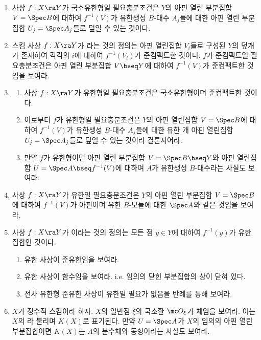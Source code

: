 	\begin{enumerate}[label=\tb{3.\arabic*.},itemindent=0mm,itemsep=2mm]
	\item 사상 $f:X\ra Y$가 국소유한형일 필요충분조건은 $Y$의  아핀 열린 부분집합 $V=\Spec B$에 대하여
	$f^{-1}(V)$가 유한생성 $B$-대수 $A_j$들에 대한 아핀 열린 부분집합 $U_j=\Spec A_j$들로 덮일 수 있는 것이다.
	\item 스킴 사상 $f:X\ra Y$가 라는 것의 정의는 아핀 열린집합 $V_i$들로 구성된
	$Y$의 덮개가 존재하여 각각의 $i$에 대하여 $f^{-1}(V_i)$가 준컴팩트한 것이다.
	$f$가 준컴팩트일 필요충분조건은  아핀 열린 부분집합 $V\bseq Y$에 대하여 $f^{-1}(V)$가 준컴팩트한 것임을 보여라.
	\item \begin{enumerate}[label=(\alph*)]
	\item 사상 $f:X\ra Y$가 유한형일 필요충분조건은 국소유한형이며 준컴팩트한 것이다.
	\item 이로부터 $f$가 유한형일 필요충분조건은 $Y$의  아핀 열린집합 $V=\Spec B$에 대하여
	$f^{-1}(V)$가 유한생성 $B$-대수 $A_j$들에 대한 유한 개 아핀 열린집합 $U_j=\Spec A_j$들로 덮일 수 있는 것이라 결론지어라.
	\item 만약 $f$가 유한형이면  아핀 열린 부분집합 $V=\Spec B\bseq Y$와
	 아핀 열린집합 $U=\Spec A\bseq f^{-1}(V)$에 대하여 $A$가 유한생성 $B$-대수라는 사실도 보여라.
	\end{enumerate}
	\item 사상 $f:X\ra Y$가 유한일 필요충분조건은 $Y$의  아핀 열린 부분집합 $V=\Spec B$에 대하여
	$f^{-1}(V)$가 아핀이며 유한 $B$-모듈에 대한 $\Spec A$와 같은 것임을 보여라.
	\item 사상 $f:X\ra Y$가 이라는 것의 정의는 모든 점 $y\in Y$에 대하여 $f^{-1}(y)$가 유한집합인 것이다.
	\begin{enumerate}[label=(\alph*)]
	\item 유한 사상이 준유한임을 보여라.
	\item 유한 사상이  함수임을 보여라. i.e. 임의의 닫힌 부분집합의 상이 닫혀 있다.
	\item 전사 유한형 준유한 사상이 유한일 필요가 없음을 반례를 통해 보여라.
	\end{enumerate}
	\item $X$가 정수적 스킴이라 하자. $X$의 일반점 $\xi$의 국소환 $\mc O_\xi$가 체임을 보여라.
	이는 $X$의 라 불리며 $K(X)$로 표기된다.
	만약 $U=\Spec A$가 $X$의 임의의 아핀 열린 부분집합이면 $K(X)$는 $A$의 분수체와 동형이라는 사실도 보여라.

\end{enumerate}
